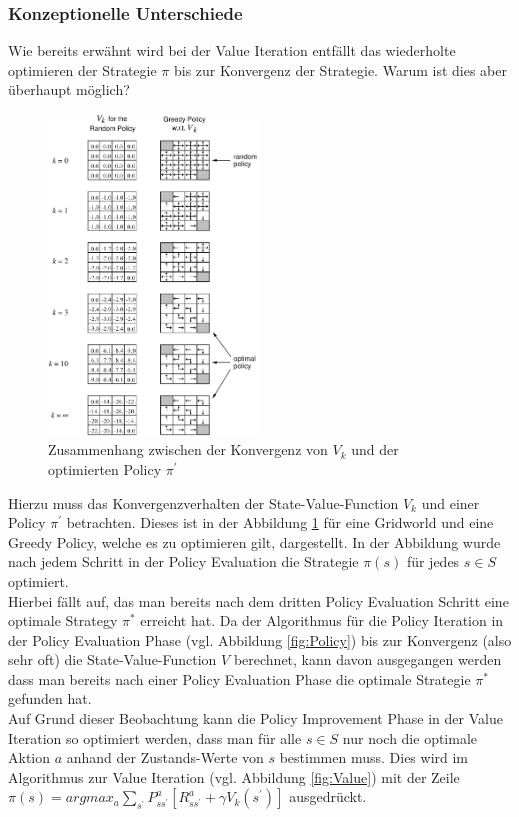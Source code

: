 \documentclass[10pt]{scrartcl}
\begin{document}
\subsubsection{Konzeptionelle Unterschiede}
Wie bereits erwähnt wird bei der Value Iteration entfällt das wiederholte optimieren der Strategie $\pi$ bis zur Konvergenz der Strategie.
Warum ist dies aber überhaupt möglich?\\

\begin{figure}[htbp]
	\centering	\includegraphics[width=0.5\textwidth]{Bilder/KonvergenzVkPolicy}
	\caption{Zusammenhang zwischen der Konvergenz von $V_{k}$ und der optimierten Policy $\pi^{'}$ }
	\label{fig:konvergenz}
\end{figure}

Hierzu muss das Konvergenzverhalten der State-Value-Function $V_{k}$ und einer Policy $\pi^{'}$ betrachten.
Dieses ist in der Abbildung \ref{fig:konvergenz} für eine Gridworld und eine Greedy Policy, welche es zu optimieren gilt, dargestellt.
In der Abbildung wurde nach jedem Schritt in der Policy Evaluation die Strategie $\pi(s)$ für jedes $s \in S$ optimiert.\\
Hierbei fällt auf, das man bereits nach dem dritten Policy Evaluation Schritt eine optimale Strategy $\pi^{*}$ erreicht hat. 
Da der Algorithmus für die Policy Iteration in der Policy Evaluation Phase (vgl. Abbildung \ref{fig:Policy}) bis zur Konvergenz (also sehr oft) die State-Value-Function $V$ berechnet, kann davon ausgegangen werden dass man bereits nach einer Policy Evaluation Phase die optimale Strategie $\pi^{*}$ gefunden hat.\\
Auf Grund dieser Beobachtung kann die Policy Improvement Phase in der Value Iteration so optimiert werden, dass man für alle $s \in S$ nur noch die optimale Aktion $a$ anhand der Zustands-Werte von $s$ bestimmen muss.
Dies wird im Algorithmus zur Value Iteration (vgl. Abbildung \ref{fig:Value}) mit der Zeile $\pi(s) = argmax_{a} \sum_{s^{'}} P^a_{ss^{'}} [R^a_{ss^{'}} + \gamma V_{k} (s^{'})]$ ausgedrückt.\\
\end{document}
